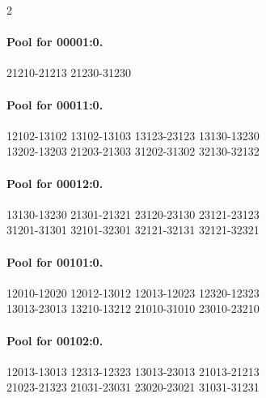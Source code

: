 \begin{multicols}{2}
\paragraph{Pool for 00001:0.}
\begingroup\footnotesize\ttfamily\begin{flushleft}
21210-21213 21230-31230\\
\end{flushleft}\endgroup
\paragraph{Pool for 00011:0.}
\begingroup\footnotesize\ttfamily\begin{flushleft}
12102-13102 13102-13103 13123-23123 13130-13230\\
13202-13203 21203-21303 31202-31302 32130-32132\\
\end{flushleft}\endgroup
\paragraph{Pool for 00012:0.}
\begingroup\footnotesize\ttfamily\begin{flushleft}
13130-13230 21301-21321 23120-23130 23121-23123\\
31201-31301 32101-32301 32121-32131 32121-32321\\
\end{flushleft}\endgroup
\paragraph{Pool for 00101:0.}
\begingroup\footnotesize\ttfamily\begin{flushleft}
12010-12020 12012-13012 12013-12023 12320-12323\\
13013-23013 13210-13212 21010-31010 23010-23210\\
\end{flushleft}\endgroup
\paragraph{Pool for 00102:0.}
\begingroup\footnotesize\ttfamily\begin{flushleft}
12013-13013 12313-12323 13013-23013 21013-21213\\
21023-21323 21031-23031 23020-23021 31031-31231\\
\end{flushleft}\endgroup

\end{multicols}
